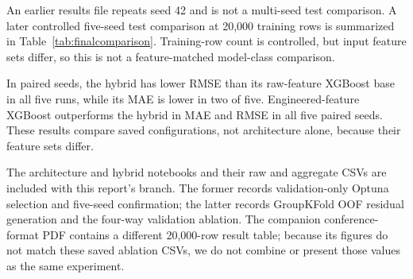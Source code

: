 \documentclass[conference]{IEEEtran}
\begin{document}
An earlier results file repeats seed 42 and is not a multi-seed test comparison. A later controlled five-seed test comparison at 20,000 training rows is summarized in Table~\ref{tab:finalcomparison}. Training-row count is controlled, but input feature sets differ, so this is not a feature-matched model-class comparison.

\begin{table}[!t]
\centering
\caption{Five-seed held-out test comparison at 20,000 training rows. Values are mean $\pm$ standard deviation.}
\label{tab:finalcomparison}
\end{table}

In paired seeds, the hybrid has lower RMSE than its raw-feature XGBoost base in all five runs, while its MAE is lower in two of five. Engineered-feature XGBoost outperforms the hybrid in MAE and RMSE in all five paired seeds. These results compare saved configurations, not architecture alone, because their feature sets differ.

The architecture and hybrid notebooks and their raw and aggregate CSVs are included with this report's branch. The former records validation-only Optuna selection and five-seed confirmation; the latter records GroupKFold OOF residual generation and the four-way validation ablation. The companion conference-format PDF contains a different 20,000-row result table; because its figures do not match these saved ablation CSVs, we do not combine or present those values as the same experiment.
\end{document}
